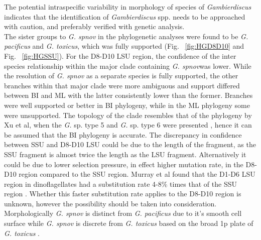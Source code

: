 \documentclass[12pt]{article}
\begin{document}
The potential intraspecific variability in morphology of species of \textit{Gambierdiscus} indicates that the identification of \emph{Gambierdiscus} spp. needs to be approached with caution, and preferably verified with genetic analysis.\\
The sister groups to \emph{G. spnov} in the phylogenetic analyses were found to be \emph{G. pacificus} and \emph{G. toxicus}, which was fully supported (Fig. ~\ref{fig:HGD8D10} and Fig. ~\ref{fig:HGSSU}). For the D8-D10 LSU region, the confidence of the inter species relationship within the major clade containing \emph{G. spnov}was lower.  While the resolution of \emph{G. spnov} as a separate species is fully supported, the other branches within that major clade were more ambiguous and support differed between BI and ML with the latter consistently lower than the former. Branches were well supported or better in BI phylogeny, while in the ML phylogeny some were unsupported. The topology of the clade resembles that of the phylogeny by Xu et al, when the \emph{G.} sp. type 5 and \emph{G.} sp. type 6 were presented \citep{xu2014distribution}, hence it can be assumed that the BI phylogeny is accurate.
The discrepancy in confidence between SSU and D8-D10 LSU could be due to the length of the fragment, as the SSU fragment is almost twice the length as the LSU fragment. Alternatively it could be due to lower selection pressure, in effect higher mutation rate, in the D8-D10 region compared to the SSU region. Murray et al found that the D1-D6 LSU region in dinoflagellates had a substitution rate 4-8\% times that of the SSU region \citep{murray2005improving}. Whether this faster substitution rate applies to the D8-D10 region is unknown, however the possibility should be taken into consideration. \\
Morphologically \emph{G. spnov} is distinct from \emph{G. pacificus} due to it's smooth cell surface \citep{chinain1999morphology} while \emph{G. spnov} is discrete from \emph{G. toxicus} based on the broad 1p plate of \emph{G. toxicus} \citep{litaker2009taxonomy}.\\
\end{document}
